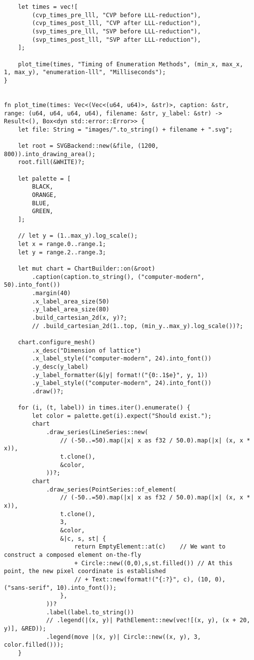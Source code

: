 \begin{verbatim}
    let times = vec![
        (cvp_times_pre_lll, "CVP before LLL-reduction"),
        (cvp_times_post_lll, "CVP after LLL-reduction"),
        (svp_times_pre_lll, "SVP before LLL-reduction"),
        (svp_times_post_lll, "SVP after LLL-reduction"),
    ];

    plot_time(times, "Timing of Enumeration Methods", (min_x, max_x, 1, max_y), "enumeration-lll", "Milliseconds");
}


fn plot_time(times: Vec<(Vec<(u64, u64)>, &str)>, caption: &str, range: (u64, u64, u64, u64), filename: &str, y_label: &str) -> Result<(), Box<dyn std::error::Error>> {
    let file: String = "images/".to_string() + filename + ".svg";

    let root = SVGBackend::new(&file, (1200, 800)).into_drawing_area();
    root.fill(&WHITE)?;

    let palette = [
        BLACK,
        ORANGE,
        BLUE,
        GREEN,
    ];

    // let y = (1..max_y).log_scale();
    let x = range.0..range.1;
    let y = range.2..range.3;

    let mut chart = ChartBuilder::on(&root)
        .caption(caption.to_string(), ("computer-modern", 50).into_font())
        .margin(40)
        .x_label_area_size(50)
        .y_label_area_size(80)
        .build_cartesian_2d(x, y)?;
        // .build_cartesian_2d(1..top, (min_y..max_y).log_scale())?;

    chart.configure_mesh()
        .x_desc("Dimension of lattice")
        .x_label_style(("computer-modern", 24).into_font())
        .y_desc(y_label)
        .y_label_formatter(&|y| format!("{0:.1$e}", y, 1))
        .y_label_style(("computer-modern", 24).into_font())
        .draw()?;

    for (i, (t, label)) in times.iter().enumerate() {
        let color = palette.get(i).expect("Should exist.");
        chart
            .draw_series(LineSeries::new(
                // (-50..=50).map(|x| x as f32 / 50.0).map(|x| (x, x * x)),
                t.clone(),
                &color,
            ))?;
        chart
            .draw_series(PointSeries::of_element(
                // (-50..=50).map(|x| x as f32 / 50.0).map(|x| (x, x * x)),
                t.clone(),
                3,
                &color,
                &|c, s, st| {
                    return EmptyElement::at(c)    // We want to construct a composed element on-the-fly
                    + Circle::new((0,0),s,st.filled()) // At this point, the new pixel coordinate is established
                    // + Text::new(format!("{:?}", c), (10, 0), ("sans-serif", 10).into_font());
                },
            ))?
            .label(label.to_string())
            // .legend(|(x, y)| PathElement::new(vec![(x, y), (x + 20, y)], &RED));
            .legend(move |(x, y)| Circle::new((x, y), 3, color.filled()));
    }


\end{verbatim}
